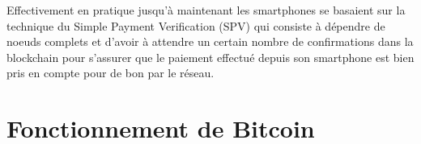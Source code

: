 \documentclass[12pt,a4paper]{article}
\begin{document}
	Effectivement en pratique jusqu'à maintenant les smartphones se basaient sur la technique du Simple Payment Verification (SPV) qui consiste à dépendre de noeuds complets et d'avoir à attendre un certain nombre de confirmations dans la blockchain pour s'assurer que le paiement effectué depuis son smartphone est bien pris en compte pour de bon par le réseau.\\
	
	
	
	\newpage
	
	\section{Fonctionnement de Bitcoin} %
	
\end{document}
